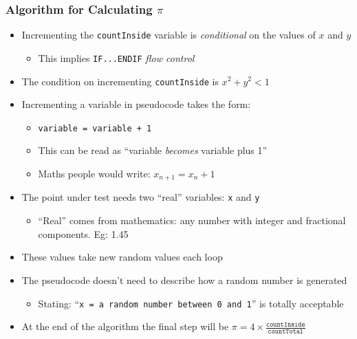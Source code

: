 \documentclass[14pt]{beamer}
\begin{document}
\begin{frame}
\frametitle{Algorithm for Calculating $\pi$}
\begin{itemize}
\item Incrementing the \texttt{countInside} variable is \textit{conditional} on the values of $x$ and $y$
	\begin{itemize}
		\item This implies \texttt{IF...ENDIF} \textit{flow control}
	\end{itemize}
\item The condition on incrementing \texttt{countInside} is $x^2 + y^2 < 1$
\item Incrementing a variable in pseudocode takes the form:
	\begin{itemize}
		\item \texttt{variable = variable + 1}
		\item This can be read as ``variable \textit{becomes} variable plus 1''
		\item Maths people would write: $x_{n+1} = x_n + 1$
	\end{itemize}
\end{itemize}
\end{frame}

\begin{frame}
\begin{itemize}
\item The point under test needs two ``real'' variables: \texttt{x} and \texttt{y}
	\begin{itemize}
 		\item ``Real'' comes from mathematics: any number with integer and fractional components. Eg: 1.45
	\end{itemize}
\item These values take new random values each loop
\item The pseudocode doesn't need to describe how a random number is generated
	\begin{itemize}
		\item Stating: ``\texttt{x = a random number between 0 and 1}'' is totally acceptable
	\end{itemize}
\item At the end of the algorithm the final step will be $\pi = 4\times \frac{\texttt{countInside}}{\texttt{countTotal}}$
\end{itemize}
\end{frame}
\end{document}
